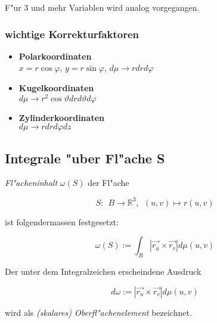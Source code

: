 \documentclass[10pt, a4paper, twocolumn]{scrartcl}
\begin{document}
F"ur 3 und mehr Variablen wird analog vorgegangen.

\subsubsection{wichtige Korrekturfaktoren}

\begin{itemize}
 \item \textbf{Polarkoordinaten}\\
  $x=r\cos\varphi$, $y=r\sin\varphi$, $d\mu\rightarrow rdrd\varphi$
 \item \textbf{Kugelkoordinaten}\\
  $d\mu \rightarrow r^2\cos\vartheta drd\vartheta d\varphi$
 \item \textbf{Zylinderkoordinaten}\\
  $d\mu \rightarrow rdrd\varphi dz$
\end{itemize}

\subsection{Integrale "uber Fl"ache S}

\textit{Fl"acheninhalt} $\omega(S)$ der Fl"ache

$$S:\:\:B\rightarrow\mathbb{R}^3,\:\:(u,v)\mapsto r(u,v)$$

ist folgendermassen festgesetzt:

$$\omega(S):=\int_B|\vec{r_u}\times\vec{r_v}|d\mu(u,v)$$

Der unter dem Integralzeichen erscheindene Ausdruck

$$d\omega:=|\vec{r_u}\times\vec{r_v}|d\mu(u,v)$$

wird als \textit{(skalares) Oberfl"achenelement} bezeichnet.\\
\end{document}
